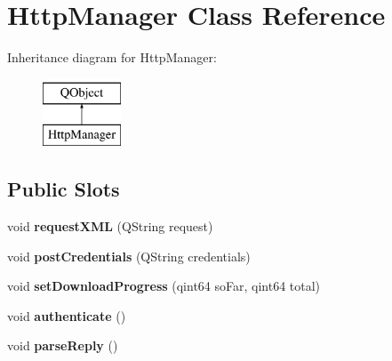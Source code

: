 \hypertarget{classHttpManager}{\section{Http\-Manager Class Reference}
\label{classHttpManager}
}
Inheritance diagram for Http\-Manager\-:\begin{figure}[H]
\begin{center}
\leavevmode
\includegraphics[height=2.000000cm]{classHttpManager}
\end{center}
\end{figure}
\subsection*{Public Slots}
\begin{DoxyCompactItemize}
\item 
\hypertarget{classHttpManager_a3079b9d369e775ed7bd0a3c86a7a5650}{void {\bfseries request\-X\-M\-L} (Q\-String request)}\label{classHttpManager_a3079b9d369e775ed7bd0a3c86a7a5650}

\item 
\hypertarget{classHttpManager_ac1e6cdef1723a7b28a348b3046ddfe86}{void {\bfseries post\-Credentials} (Q\-String credentials)}\label{classHttpManager_ac1e6cdef1723a7b28a348b3046ddfe86}

\item 
\hypertarget{classHttpManager_ac2d51aca5099ecc22abed34fc2d20083}{void {\bfseries set\-Download\-Progress} (qint64 so\-Far, qint64 total)}\label{classHttpManager_ac2d51aca5099ecc22abed34fc2d20083}

\item 
\hypertarget{classHttpManager_a7dd56984ebb6adbad298a755c0b4d66a}{void {\bfseries authenticate} ()}\label{classHttpManager_a7dd56984ebb6adbad298a755c0b4d66a}

\item 
\hypertarget{classHttpManager_ae32365e36d3f1c435438531d7d20441a}{void {\bfseries parse\-Reply} ()}\label{classHttpManager_ae32365e36d3f1c435438531d7d20441a}

\end{DoxyCompactItemize}

